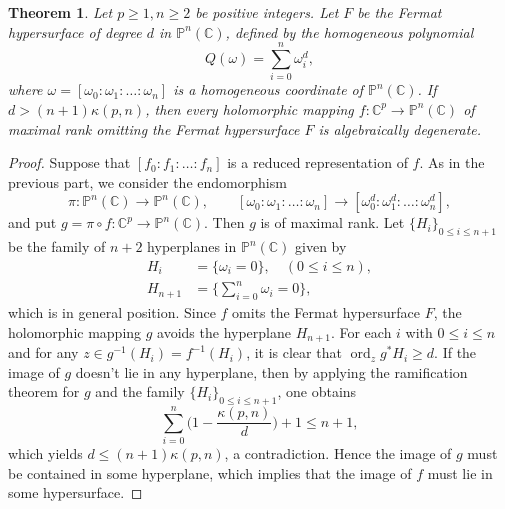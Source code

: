 \documentclass[english, 12pt]{amsart}
\DeclareMathOperator{\ord}{ord}
\theoremstyle{plain}
\newtheorem{thm}{Theorem}[section]
\theoremstyle{remark}
\numberwithin{equation}{section}
\theoremstyle{plain}
\theoremstyle{named}
\begin{document}
\begin{thm}
\label{degeneracy of holomorphic mapping omitting fermat hypersurface}	
Let $p\geq 1,n\geq2$ be positive integers. Let $F$ be the Fermat hypersurface of degree $d$ in $\mathbb{P}^n(\mathbb{C})$, defined by the homogeneous polynomial 
	$$
	Q(\omega)=\sum_{i=0}^n\omega_i^d,
	$$
	where $\omega=[\omega_0:\omega_1:\dots:\omega_n]$ is a homogeneous coordinate of $\mathbb{P}^n(\mathbb{C})$.
	If $d>(n+1)\kappa(p,n)$, then  every holomorphic mapping $f\colon\mathbb{C}^p\rightarrow\mathbb{P}^n(\mathbb{C})$ of maximal rank omitting the Fermat hypersurface $F$ is algebraically degenerate.
\end{thm}
\begin{proof}
 Suppose that $[f_0:f_1:\dots:f_n]$ is a reduced representation of $f$. As in the previous part, we consider the endomorphism $$\pi\colon\mathbb{P}^n(\mathbb{C})\rightarrow\mathbb{P}^n(\mathbb{C}),\qquad [\omega_0:\omega_1:\dots:\omega_n]\rightarrow [\omega_0^d:\omega_1^d:\dots:\omega_n^d],
$$
and put $g=\pi\circ f\colon\mathbb{C}^p\rightarrow\mathbb{P}^n(\mathbb{C})$. Then $g$ is of maximal rank. Let $\{H_i\}_{0\leq i\leq n+1}$ be the family of $n+2$ hyperplanes in $\mathbb{P}^{n}(\mathbb{C})$ given by
\begin{align*}
H_i&=\{\omega_i=0\},\quad(0\leq i\leq n),\\
H_{n+1}&=\big\{\sum_{i=0}^{n}\omega_i=0\big\},
\end{align*}
 which is in general position. Since $f$ omits the Fermat hypersurface $F$, the holomorphic mapping $g$ avoids the hyperplane $H_{n+1}$. For each $i$ with $0\leq i\leq n$ and for any $z\in g^{-1}(H_i)=f^{-1}(H_i)$, it is clear that $\ord_zg^*H_i\geq d$. If the image of $g$ doesn't lie in any hyperplane, then by applying the ramification theorem for $g$ and the family $\{H_i\}_{0\leq i\leq n+1}$, one obtains
	\[
	\sum_{i=0}^{n}\bigg(1-\dfrac{\kappa(p,n)}{d}\bigg)+1\leq n+1,
	\]
	which yields $d\leq (n+1)\kappa(p,n)$, a contradiction. Hence the image of $g$ must be contained in some hyperplane, which implies that the image of $f$ must lie in some hypersurface.
\end{proof}	
\end{document}
